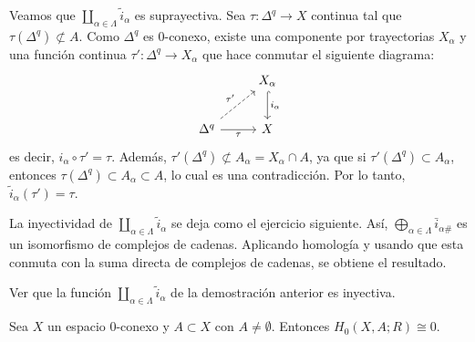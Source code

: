 \begin{dem}
Veamos que $\coprod_{\alpha \in \Lambda} \tilde{i}_\alpha$ es suprayectiva. Sea $\tau \colon \Delta^q \to X$ continua tal que $\tau(\Delta^q) \not\subset A$. Como $\Delta^q$ es $0$-conexo, existe una componente por trayectorias $X_\alpha$ y una función continua $\tau' \colon \Delta^q \to X_\alpha$ que hace conmutar el siguiente diagrama:
\[
\begin{tikzcd}[column sep=2.6em, row sep=2.2em]
& X_\alpha \arrow[d, hook, "i_\alpha"] \\
\Delta^q \arrow[ur, dashed, "\tau'"] \arrow[r, "\tau"'] & X
\end{tikzcd}
\]
es decir, $i_\alpha \circ \tau' = \tau$. Además, $\tau'(\Delta^q) \not\subset A_\alpha = X_\alpha \cap A$, ya que si $\tau'(\Delta^q) \subset A_\alpha$, entonces $\tau(\Delta^q) \subset A_\alpha \subset A$, lo cual es una contradicción. Por lo tanto, $\tilde{i}_\alpha(\tau') = \tau$.

La inyectividad de $\coprod_{\alpha \in \Lambda} \tilde{i}_\alpha$ se deja como el ejercicio siguiente. Así, $\bigoplus_{\alpha \in \Lambda} \bar{i}_{\alpha\#}$ es un isomorfismo de complejos de cadenas. Aplicando homología y usando que esta conmuta con la suma directa de complejos de cadenas, se obtiene el resultado.
\end{dem}

\begin{ejercicio}
Ver que la función $\coprod_{\alpha \in \Lambda} \tilde{i}_\alpha$ de la demostración anterior es inyectiva.
\end{ejercicio}

\begin{prop}
Sea $X$ un espacio $0$-conexo y $A \subset X$ con $A \neq \emptyset$. Entonces $H_0(X, A; R) \cong 0$.
\end{prop}

